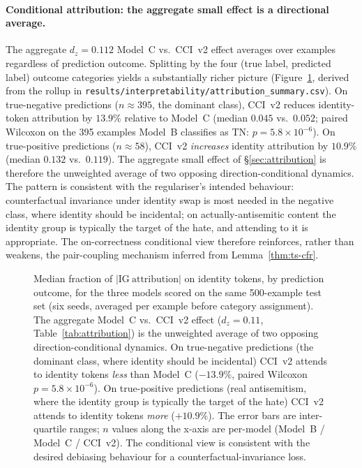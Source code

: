 \paragraph{Conditional attribution: the aggregate small effect is a directional average.}
The aggregate $d_z = 0.112$ Model~C vs.\ CCI~v2 effect averages over examples regardless of prediction outcome. Splitting by the four (true label, predicted label) outcome categories yields a substantially richer picture (Figure~\ref{fig:attribution_by_outcome}, derived from the rollup in \texttt{results/interpretability/attribution\_summary.csv}). On true-negative predictions ($n \approx 395$, the dominant class), CCI~v2 reduces identity-token attribution by $13.9\%$ relative to Model~C (median $0.045$ vs.\ $0.052$; paired Wilcoxon on the 395 examples Model~B classifies as TN: $p = 5.8 \times 10^{-6}$). On true-positive predictions ($n \approx 58$), CCI~v2 \emph{increases} identity attribution by $10.9\%$ (median $0.132$ vs.\ $0.119$). The aggregate small effect of \S\ref{sec:attribution} is therefore the unweighted average of two opposing direction-conditional dynamics. The pattern is consistent with the regulariser's intended behaviour: counterfactual invariance under identity swap is most needed in the negative class, where identity should be incidental; on actually-antisemitic content the identity group is typically the target of the hate, and attending to it is appropriate. The on-correctness conditional view therefore reinforces, rather than weakens, the pair-coupling mechanism inferred from Lemma~\ref{thm:ts-cfr}.

\begin{figure}[h]
\centering
\caption{Median fraction of $|\mathrm{IG\ attribution}|$ on identity tokens, by prediction outcome, for the three models scored on the same 500-example test set (six seeds, averaged per example before category assignment). The aggregate Model~C vs.\ CCI~v2 effect ($d_z = 0.11$, Table~\ref{tab:attribution}) is the unweighted average of two opposing direction-conditional dynamics. On true-negative predictions (the dominant class, where identity should be incidental) CCI~v2 attends to identity tokens \emph{less} than Model~C ($-13.9\%$, paired Wilcoxon $p = 5.8 \times 10^{-6}$). On true-positive predictions (real antisemitism, where the identity group is typically the target of the hate) CCI~v2 attends to identity tokens \emph{more} ($+10.9\%$). The error bars are inter-quartile ranges; $n$ values along the x-axis are per-model (Model~B / Model~C / CCI~v2). The conditional view is consistent with the desired debiasing behaviour for a counterfactual-invariance loss.}
\label{fig:attribution_by_outcome}
\end{figure}

